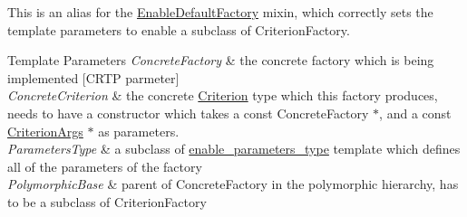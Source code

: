 This is an alias for the \hyperlink{classgko_1_1EnableDefaultFactory}{Enable\+Default\+Factory} mixin, which correctly sets the template parameters to enable a subclass of Criterion\+Factory. 


\begin{DoxyTemplParams}{Template Parameters}
{\em Concrete\+Factory} & the concrete factory which is being implemented \mbox{[}C\+R\+TP parmeter\mbox{]} \\
\hline
{\em Concrete\+Criterion} & the concrete \hyperlink{classgko_1_1stop_1_1Criterion}{Criterion} type which this factory produces, needs to have a constructor which takes a const Concrete\+Factory $\ast$, and a const \hyperlink{structgko_1_1stop_1_1CriterionArgs}{Criterion\+Args} $\ast$ as parameters. \\
\hline
{\em Parameters\+Type} & a subclass of \hyperlink{structgko_1_1enable__parameters__type}{enable\+\_\+parameters\+\_\+type} template which defines all of the parameters of the factory \\
\hline
{\em Polymorphic\+Base} & parent of Concrete\+Factory in the polymorphic hierarchy, has to be a subclass of Criterion\+Factory \\
\hline
\end{DoxyTemplParams}
